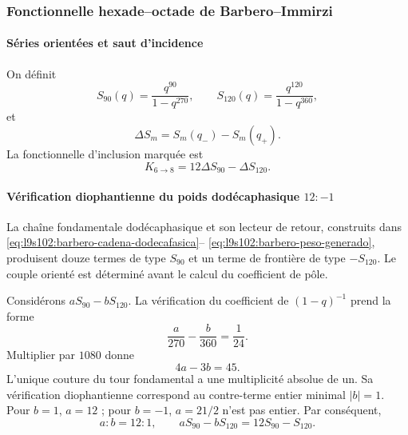 \subsubsection{Fonctionnelle hexade--octade de Barbero--Immirzi}

\paragraph{Séries orientées et saut d'incidence}

On définit
\begin{equation}
S_{90}(q)=\frac{q^{90}}{1-q^{270}},
\qquad
S_{120}(q)=\frac{q^{120}}{1-q^{360}},
\label{eq:barbero-series}
\end{equation}
et
\[
\Delta S_m=S_m(q_-)-S_m(q_+).
\]
La fonctionnelle d'inclusion marquée est
\begin{equation}
K_{6\to8}=12\Delta S_{90}-\Delta S_{120}.
\label{eq:barbero-núcleo}
\end{equation}

\paragraph{Vérification diophantienne du poids dodécaphasique \(12:-1\)}

La chaîne fondamentale dodécaphasique et son lecteur de retour, construits dans
\eqref{eq:l9s102:barbero-cadena-dodecafasica}--%
\eqref{eq:l9s102:barbero-peso-generado}, produisent douze termes de type
\(S_{90}\) et un terme de frontière de type \(-S_{120}\). Le couple orienté
est déterminé avant le calcul du coefficient de pôle.

Considérons \(aS_{90}-bS_{120}\). La vérification du coefficient de
\((1-q)^{-1}\) prend la forme
\begin{equation}
\frac{a}{270}-\frac{b}{360}=\frac1{24}.
\label{eq:pole-condition}
\end{equation}
Multiplier par \(1080\) donne
\[
4a-3b=45.
\]
L'unique couture du tour fondamental a une multiplicité absolue de un.
Sa vérification diophantienne correspond au contre-terme entier minimal
\(|b|=1\). Pour \(b=1\), \(a=12\) ; pour \(b=-1\), \(a=21/2\) n'est pas entier.
Par conséquent,
\begin{equation}
\boxed{a:b=12:1,\qquad aS_{90}-bS_{120}=12S_{90}-S_{120}.}
\label{eq:12minus1}
\end{equation}

